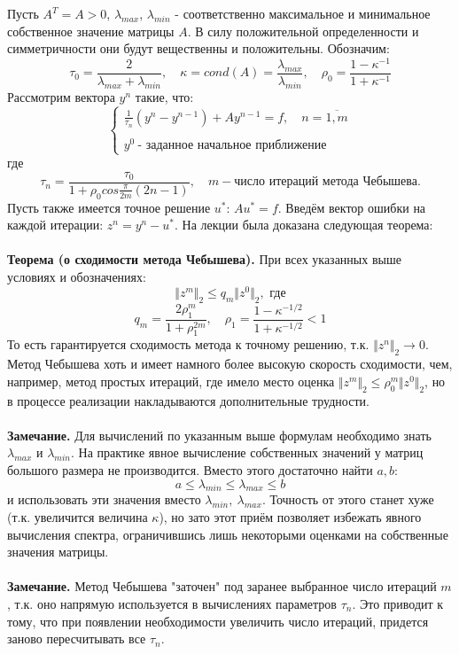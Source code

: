\documentclass[a4paper,12pt,titlepage,final]{article}
\begin{document}
Пусть $A^T = A > 0$, $\lambda_{max}$, $\lambda_{min}$ - соответственно максимальное и минимальное собственное значение матрицы $A$. В силу положительной определенности и симметричности они будут вещественны и положительны. Обозначим:
$$\tau_0 = \frac{2}{\lambda_{max} + \lambda_{min}}, \quad
\kappa = cond(A) = \frac{\lambda_{max}}{\lambda_{min}}, \quad \rho_0 = \frac{1 - \kappa^{-1}}{1 + \kappa^{-1}}$$
Рассмотрим вектора $y^n$ такие, что:
$$\begin{cases}
 \frac{1}{\tau_n}(y^n - y^{n-1}) + Ay^{n-1} = f, \quad n = \overline{1, m} \\ \\
y^0 \: \text{- заданное начальное приближение}
\end{cases}$$
где
$$\tau_n = \frac{\tau_0}{1 + \rho_0cos\frac{\pi}{2m}(2n-1)}, \quad m - \text{число итераций метода Чебышева.}$$
Пусть также имеется точное решение $u^*$: $Au^* = f$. Введём вектор ошибки на каждой итерации: $z^n = y^n - u^*$. На лекции была доказана следующая теорема: \\ \\
\textbf{Теорема (о сходимости метода Чебышева).}  При всех указанных выше условиях и обозначениях:
$$\Vert z^m \Vert_2 \leq q_m \Vert z^0 \Vert_2, \text{ где}$$
$$q_m = \frac{2\rho_1^m}{1 + \rho_1^{2m}}, \quad \rho_1 = \frac{1 - \kappa^{-1/2}}{1 + \kappa^{-1/2}} < 1$$
То есть гарантируется сходимость метода к точному решению, т.к. $\Vert z^n \Vert_2 \to 0$. Метод Чебышева хоть и имеет намного более высокую скорость сходимости, чем, например, метод простых итераций, где имело место оценка $\Vert z^m \Vert_2 \leq \rho_0^m \Vert z^0 \Vert_2$, но в процессе реализации накладываются дополнительные трудности.\\\\
\textbf{Замечание.} Для вычислений по указанным выше формулам необходимо знать $\lambda_{max}$ и $\lambda_{min}$. На практике явное вычисление собственных значений у матриц большого размера не производится. Вместо этого достаточно найти $a, b:$ 
$$a \leq \lambda_{min} \leq \lambda_{max} \leq b$$
и использовать эти значения вместо $\lambda_{min},\: \lambda_{max}$. Точность от этого станет хуже (т.к. увеличится величина $\kappa$), но зато этот приём позволяет избежать явного вычисления спектра, ограничившись лишь некоторыми оценками на собственные значения матрицы.\\\\
\textbf{Замечание.} Метод Чебышева "заточен" \; под заранее выбранное число итераций $m$, т.к. оно напрямую используется в вычислениях параметров $\tau_n$. Это приводит к тому, что при появлении необходимости увеличить число итераций, придется заново пересчитывать все $\tau_n$. \\\\
\end{document}

